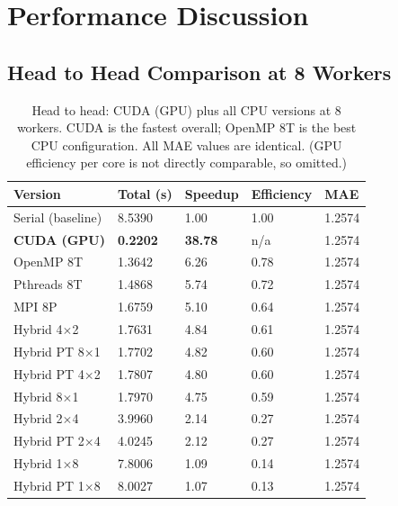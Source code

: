 \documentclass[11pt,a4paper]{article}
\begin{document}
\section{Performance Discussion}\label{sec:discussion}

\subsection{Head to Head Comparison at 8 Workers}

\begin{table}[!htbp]
\centering
\begin{tabular}{L{3.4cm} R{2.2cm} R{2.2cm} R{2.2cm} R{2.0cm}}
\toprule
\textbf{Version} & \textbf{Total (s)} & \textbf{Speedup} &
\textbf{Efficiency} & \textbf{MAE} \\
\midrule
Serial (baseline)        & 8.5390 & 1.00 & 1.00 & 1.2574 \\
\textbf{CUDA (GPU)}      & \textbf{0.2202} & \textbf{38.78} & n/a & 1.2574 \\
OpenMP 8T                & 1.3642 & 6.26 & 0.78 & 1.2574 \\
Pthreads 8T              & 1.4868 & 5.74 & 0.72 & 1.2574 \\
MPI 8P                   & 1.6759 & 5.10 & 0.64 & 1.2574 \\
Hybrid 4$\times$2        & 1.7631 & 4.84 & 0.61 & 1.2574 \\
Hybrid PT 8$\times$1     & 1.7702 & 4.82 & 0.60 & 1.2574 \\
Hybrid PT 4$\times$2     & 1.7807 & 4.80 & 0.60 & 1.2574 \\
Hybrid 8$\times$1        & 1.7970 & 4.75 & 0.59 & 1.2574 \\
Hybrid 2$\times$4        & 3.9960 & 2.14 & 0.27 & 1.2574 \\
Hybrid PT 2$\times$4     & 4.0245 & 2.12 & 0.27 & 1.2574 \\
Hybrid 1$\times$8        & 7.8006 & 1.09 & 0.14 & 1.2574 \\
Hybrid PT 1$\times$8     & 8.0027 & 1.07 & 0.13 & 1.2574 \\
\bottomrule
\end{tabular}
\caption{Head to head: CUDA (GPU) plus all CPU versions at 8 workers. CUDA is the
fastest overall; OpenMP 8T is the best CPU configuration. All MAE values are
identical. (GPU efficiency per core is not directly comparable, so omitted.)}
\end{table}
\end{document}

